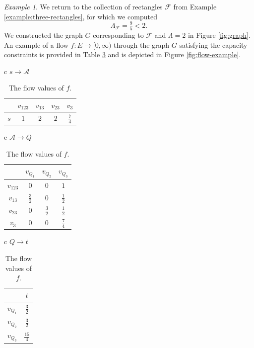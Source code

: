 \documentclass[a4paper, oneside,11pt]{amsart}
\theoremstyle{definition}
\theoremstyle{remark}
\newtheorem{example}[theorem]{Example}
\numberwithin{equation}{section}
\newcommand{\mc}{\mathcal}
\begin{document}
\begin{example}\label{example:three-rectangle-algorithms}
We return to the collection of rectangles $\mc{F}$ from Example \ref{example:three-rectangles}, for which we computed
$$
\Lambda_{\mc{F}}= \tfrac95 <2.
$$
We constructed the graph $G$ corresponding to $\mc{F}$ and $\Lambda=2$ in Figure \ref{fig:graph}. An example of a flow $f\colon E\to [0,\infty)$ through the graph $G$ satisfying the capacity constraints is provided in Table \ref{tab:1} and is depicted in Figure \ref{fig:flow-example}.




\begin{table}[htbp]
\centering
\caption{The flow values of $f$.}
\label{tab:1}
\renewcommand{\arraystretch}{1.25}

\begin{tabular}[t]{c}
{\scriptsize $s \to \mathcal A$}\\[2pt]
\begin{tabular}{c|cccc}
 & $v_{123}$ & $v_{13}$ & $v_{23}$ & $v_3$ \\ \hline
$s$ & $1$ & $2$ & $2$ & $\tfrac74$
\end{tabular}
\end{tabular}
\hspace{0.2cm}
\begin{tabular}[t]{c}
{\scriptsize $\mathcal A \to Q$}\\[2pt]
\begin{tabular}{c|ccc}
 & $v_{Q_1}$ & $v_{Q_2}$ & $v_{Q_3}$ \\ \hline
$v_{123}$ & $0$ & $0$ & $1$ \\
$v_{13}$  & $\tfrac32$ & $0$ & $\tfrac12$ \\
$v_{23}$  & $0$ & $\tfrac32$ & $\tfrac12$ \\
$v_3$     & $0$ & $0$ & $\tfrac74$
\end{tabular}
\end{tabular}
\hspace{0.2cm}
\begin{tabular}[t]{c}
{\scriptsize $Q \to t$}\\[2pt]
\begin{tabular}{c|c}
 & $t$ \\ \hline
$v_{Q_1}$ & $\tfrac32$ \\
$v_{Q_2}$ & $\tfrac32$ \\
$v_{Q_3}$ & $\tfrac{15}{4}$
\end{tabular}
\end{tabular}
\end{table}


\end{example}
\end{document}

